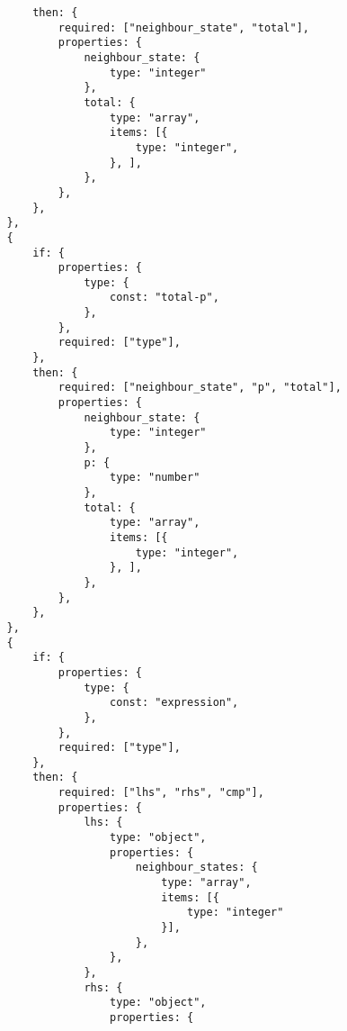\begin{verbatim}
                    then: {
                        required: ["neighbour_state", "total"],
                        properties: {
                            neighbour_state: {
                                type: "integer"
                            },
                            total: {
                                type: "array",
                                items: [{
                                    type: "integer",
                                }, ],
                            },
                        },
                    },
                },
                {
                    if: {
                        properties: {
                            type: {
                                const: "total-p",
                            },
                        },
                        required: ["type"],
                    },
                    then: {
                        required: ["neighbour_state", "p", "total"],
                        properties: {
                            neighbour_state: {
                                type: "integer"
                            },
                            p: {
                                type: "number"
                            },
                            total: {
                                type: "array",
                                items: [{
                                    type: "integer",
                                }, ],
                            },
                        },
                    },
                },
                {
                    if: {
                        properties: {
                            type: {
                                const: "expression",
                            },
                        },
                        required: ["type"],
                    },
                    then: {
                        required: ["lhs", "rhs", "cmp"],
                        properties: {
                            lhs: {
                                type: "object",
                                properties: {
                                    neighbour_states: {
                                        type: "array",
                                        items: [{
                                            type: "integer"
                                        }],
                                    },
                                },
                            },
                            rhs: {
                                type: "object",
                                properties: {

\end{verbatim}

